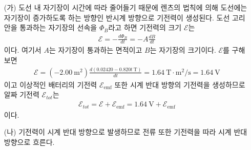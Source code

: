 \documentclass[tightenlines,floatfix,nofootinbib,superscriptaddress,fleqn]{revtex4}
\begin{document}
\begin{itemize}
  \item[(가)] 도선 내 자기장이 시간에 따라 줄어들기 때문에 렌츠의 법칙에 의해 도선에는
  자기장이 증가하도록 하는 방향인 반시계 방향으로 기전력이 생성된다. 도선 고리 안을 통과하는
  자기장의 선속을 $\Phi_B$라고 하면 기전력의 크기 
  $\mathcal{E}$는
  \begin{align}
    \mathcal{E} = -\frac{d\Phi_B}{dt} = -A\frac{dB}{dt}
  \end{align}
  이다. 여기서 $A$는 자기장이 통과하는 면적이고 $B$는 자기장의 크기이다. $\mathcal{E}$를
  구해보면
  \begin{align}
    \mathcal{E} = (-2.00~\mathrm{m^2})\frac{d(0.02420-0.820t~\mathrm{T})}{dt}
    =1.64~\mathrm{T\cdot m^2/s}=1.64~\mathrm{V}
  \end{align}
  이고 이상적인 배터리의 기전력 $\mathcal{E}_{\mathrm{emf}}$ 또한 시계 반대 방향의 기전력을
  생성하므로 알짜 기전력 $\mathcal{E}_{tot}$는
  \begin{align}
    \mathcal{E}_{tot} = \mathcal{E}+\mathcal{E}_{\mathrm{emf}}
    =1.64~\mathrm{V} + \mathcal{E}_{\mathrm{emf}}
  \end{align}
  이다.
  \item[(나)] 기전력이 시계 반대 방향으로 발생하므로 전류 또한 기전력을 따라 시계 반대 방향으로
  흐른다.
\end{itemize}
\end{document}
